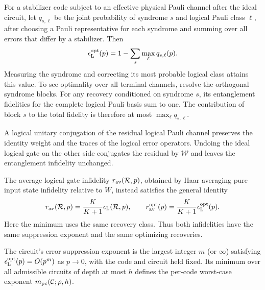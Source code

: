 \documentclass[aps,prl,reprint,longbibliography,nofootinbib,nobibnotes]{revtex4-2}
\begin{document}
For a stabilizer code subject to an effective physical Pauli channel after the ideal circuit, let
$q_{s,\ell}$ be the joint probability of syndrome $s$ and logical Pauli class $\ell$, after
choosing a Pauli representative for each syndrome and summing over all errors that differ by a
stabilizer. Then~\cite{FletcherShorWin}
\begin{equation}\label{eq:optimal-pauli-decoding}
 \epsilon_{\rm L}^{\rm opt}(p)
 =1-\sum_s\max_\ell q_{s,\ell}(p).
\end{equation}
Measuring the syndrome and correcting its most probable logical class attains this value. To see
optimality over all terminal channels, resolve the orthogonal syndrome blocks. For any recovery
conditioned on syndrome $s$, its entanglement fidelities for the complete logical Pauli basis sum
to one. The contribution of block $s$ to the total fidelity is therefore at most $\max_\ell
q_{s,\ell}$.

A logical unitary conjugation of the residual logical Pauli channel preserves the identity weight
and the traces of the logical error operators. Undoing the ideal logical gate on the other side
conjugates the residual by $\mathcal W$ and leaves the entanglement infidelity unchanged.

The average logical gate infidelity $r_{\rm av}(\mathcal R,p)$, obtained by Haar averaging
pure input state infidelity relative to $W$, instead satisfies the general
identity~\cite{NielsenAverage}
\begin{equation}\label{eq:logical-average-infidelity}
 r_{\rm av}(\mathcal R,p)
 =\frac{K}{K+1}\epsilon_{\rm L}(\mathcal R,p),
 \qquad
 r_{\rm av}^{\rm opt}(p)
 =\frac{K}{K+1}\epsilon_{\rm L}^{\rm opt}(p).
\end{equation}
Here the minimum uses the same recovery class. Thus both infidelities have the same suppression
exponent and the same optimizing recoveries.

The circuit's error suppression exponent is the largest integer $m$ (or $\infty$) satisfying
$\epsilon_{\rm L}^{\rm opt}(p)=O(p^m)$ as $p\to0$, with the code and circuit held fixed. Its
minimum over all admissible circuits of depth at most $h$ defines the per-code worst-case exponent
$m_{\rm pc}(\mathcal C;\rho,h)$.
\end{document}
